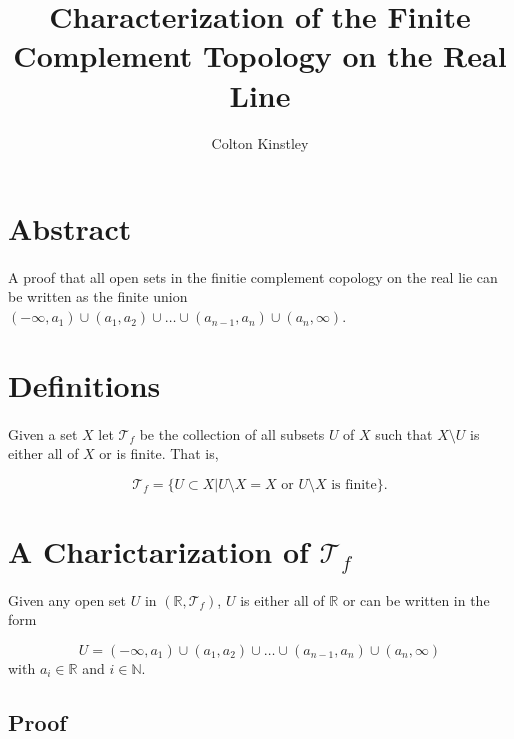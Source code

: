 \documentclass[11pt, oneside]{article}   	%
\title{Characterization of the Finite Complement Topology on the Real Line}
\author{Colton Kinstley}
\begin{document}
\maketitle



\section*{Abstract}
\paragraph{}

A proof that all open sets in the finitie complement copology on the real lie can be written as the finite union $(- \infty , a_1) \cup (a_1,a_2) \cup \dots \cup (a_{n-1}, a_n) \cup (a_n, \infty)$.


\section*{Definitions}
\paragraph{}

Given a set $X$ let $\mathscr{T}_f$ be the collection of all subsets $U$ of $X$ such that $X \setminus U$ is either all of $X$ or is finite. That is,

\[
\mathscr{T}_f = \{ U \subset X | U \setminus X = X \text{ or } U \setminus X \text{ is finite} \}.
\]




\section*{A Charictarization of $\mathscr{T}_f$}
\paragraph{}

Given any open set $U$ in $(\mathbb{R},\mathscr{T}_f)$, $U$ is either all of $\mathbb{R}$ or can be written in the form

\[
U = (- \infty , a_1) \cup (a_1,a_2) \cup \dots \cup (a_{n-1}, a_n) \cup (a_n, \infty)
\]
with $a_i \in \mathbb{R}$ and $ i \in \mathbb{N}$.

\subsection*{Proof}
\end{document}

